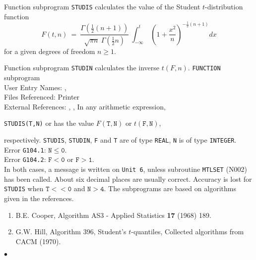                      
                   
\Submitter{}                             
Function subprogram {\tt STUDIS} calculates the value of the Student
$t$-distribution function
$$F(t,n) \ = \ \frac{\Gamma(\textstyle \frac{1}{2}(n+1))}{\sqrt{\pi n}
\ \Gamma(\textstyle \frac{1}{2}n)} \
\int_{-\infty}^t \ \left( 1+\frac{x^2}{n} \right)^{-\frac{1}{2}(n+1)}dx$$
for a given degrees of freedom $n \geq 1$.
\par
Function subprogram {\tt STUDIN} calculates the inverse $t(F,n)$.
\Structure
{\tt FUNCTION} subprogram \\
User Entry Names: , \\
Files Referenced: Printer\\
External References: , ,
\Usage
In any arithmetic expression,
\begin{center}
{\tt STUDIS(T,N)} \quad or  \quad has the value
\quad $F(\mathtt{T,N})$ \quad or \quad $t(\mathtt{F,N})$,
\end{center}
respectively. {\tt STUDIS}, {\tt STUDIN}, {\tt F} and {\tt T} are of
type {\tt REAL}, {\tt N} is of type {\tt INTEGER}.
\Errorh
Error {\tt G104.1}: $\mathtt{N \le 0}$. \\
Error {\tt G104.2}: $\mathtt{F < 0}$ or $\mathtt{F > 1}$. \\
In both cases, a message is written on {\tt Unit 6}, unless
subroutine {\tt MTLSET} (N002) has been called.
\Accuracy
About six decimal places are usually correct. Accuracy is lost
for {\tt STUDIS} when $\mathtt{T << 0}$ and $\mathtt{N > 4}$.
\Notes
The subprograms are based on algorithms given in the references.
\Refer
\begin{enumerate}
\item B.E. Cooper, Algorithm AS3 - Applied Statistics
{\bf 17} (1968) 189.
\item G.W. Hill, Algorithm 396, Student's $t$-quantiles,
Collected algorithms from CACM (1970).
\end{enumerate}
$\bullet$
